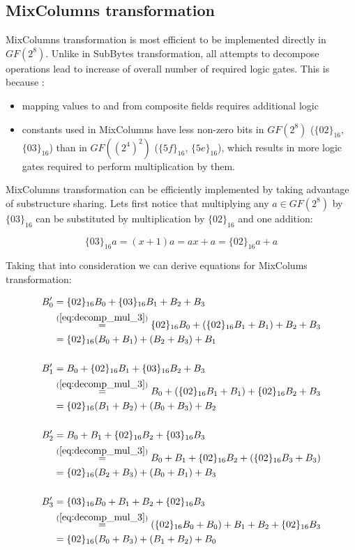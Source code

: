 \subsection{MixColumns transformation}

MixColumns transformation is most efficient to be implemented directly in $GF(2^8)$. Unlike in SubBytes transformation, all attempts to decompose operations lead to increase of overall number of required logic gates. This is because \cite{vlsi}:

\begin{itemize}[nolistsep]
\item mapping values to and from composite fields requires additional logic
\item constants used in MixColumns have less non-zero bits in $GF(2^8)$ ($\{02\}_{16}$, $\{03\}_{16}$) than in $GF((2^4)^2)$ ($\{5f\}_{16}$, $\{5e\}_{16}$), which results in more logic gates required to perform multiplication by them.
\end{itemize}

MixColumns transformation can be efficiently implemented by taking advantage of substructure sharing. Lets first notice that multiplying any $a \in GF(2^8)$ by $\{03\}_{16}$ can be substituted by multiplication by $\{02\}_{16}$ and one addition:

\begin{equation}
\label{eq:decomp_mul_3}
\{03\}_{16}a = (x + 1)a = ax + a = \{02\}_{16}a + a
\end{equation}

Taking that into consideration we can derive equations for MixColums transformation:

\begin{equation}
\label{xd}
\begin{aligned}
B_0' &= \{02\}_{16}B_0 + \{03\}_{16}B_1 + B_2 + B_3 \\
&\stackrel{(\ref{eq:decomp_mul_3})}{=}
\{02\}_{16}B_0 + (\{02\}_{16}B_1 + B_1) + B_2 + B_3 \\
&= \{02\}_{16}(B_0 + B_1) + (B_2 + B_3) + B_1 \\ \\
%
B_1' &= B_0 + \{02\}_{16}B_1 + \{03\}_{16}B_2 +  B_3 \\ 
&\stackrel{(\ref{eq:decomp_mul_3})}{=}
B_0 + (\{02\}_{16}B_1 + B_1) + \{02\}_{16}B_2 + B_3 \\ 
&= \{02\}_{16}(B_1 + B_2) + (B_0 + B_3) + B_2\\ \\
%
B_2' &= B_0 + B_1 + \{02\}_{16}B_2 + \{03\}_{16}B_3 \\
&\stackrel{(\ref{eq:decomp_mul_3})}{=}
B_0 + B_1 + \{02\}_{16}B_2 + (\{02\}_{16}B_3 + B_3) \\
&= \{02\}_{16}(B_2 + B_3) + (B_0 + B_1) + B_3 \\ \\
%
B_3' &= \{03\}_{16}B_0 + B_1 + B_2 + \{02\}_{16}B_3 \\
&\stackrel{(\ref{eq:decomp_mul_3})}{=}
(\{02\}_{16}B_0 + B_0) + B_1 + B_2 + \{02\}_{16}B_3 \\
&= \{02\}_{16}(B_0 + B_3) + (B_1 + B_2) + B_0
\end{aligned}
\end{equation}

